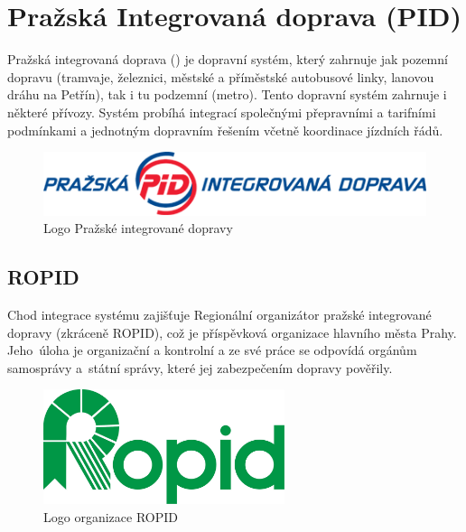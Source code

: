 \chapter{Pražská Integrovaná doprava (PID)}
\label{3-teorie-pid}

Pražská integrovaná doprava () je dopravní systém, který zahrnuje jak pozemní
dopravu (tramvaje, železnici, městské a příměstské autobusové linky, lanovou dráhu na Petřín),
tak i tu podzemní (metro). Tento dopravní systém zahrnuje i některé přívozy. 
Systém probíhá integrací společnými přepravními a tarifními podmínkami a jednotným dopravním řešením včetně 
koordinace jízdních řádů. \cite{pid}
\vskip 0.2in
 
\begin{figure}[H] \centering
    \includegraphics[width=400pt]{./pictures/pid-logo.png}
    \caption[Logo Pražské integrované dopravy]{Logo Pražské integrované dopravy \cite{pid}}
	\label{fig:pid-logo}                                
\end{figure} 

\section{ROPID}

Chod integrace systému zajišťuje Regionální organizátor pražské integrované dopravy (zkráceně ROPID),
což je příspěvková organizace hlavního města Prahy. Jeho~úloha je organizační a kontrolní
a ze své práce se odpovídá orgánům samosprávy a~státní správy, které jej zabezpečením dopravy pověřily.

\begin{figure}[H] \centering
    \includegraphics[width=200pt]{./pictures/ropid-logo.jpg}
    \caption[Logo organizace ROPID]{Logo organizace ROPID \cite{pid}}
	\label{fig:ropid-logo}                                
\end{figure}

